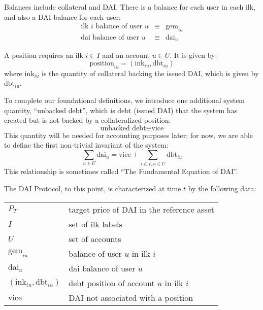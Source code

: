 \documentclass{article}
\begin{document}
Balances include collateral and DAI. There is a balance for each user in each ilk, and also a DAI balance for each user:
\begin{eqnarray}
    \text{ilk }i\text{ balance of user }u & \equiv & \text{gem}_{iu} \\
             \text{dai balance of user }u & \equiv & \text{dai}_{u}
\end{eqnarray}

A position requires an ilk \(i \in I\) and an account \(u \in U\). It is given by:
\begin{equation}
    \text{position}_{iu} = (\text{ink}_{iu}, \text{dbt}_{iu})
\end{equation}
where \(\text{ink}_{iu}\) is the quantity of collateral backing the issued DAI, which is given by \(\text{dbt}_{iu}\).

To complete our foundational definitions, we introduce one additional system quantity, ``unbacked debt'', which is debt (issued DAI) that the system has created but is not backed by a collateralized position:
\begin{equation}
    \text{unbacked debt} \equiv \text{vice}
\end{equation}
This quantity will be needed for accounting purposes later; for now, we are able to define the first non-trivial invariant of the system:
\begin{equation}
    \label{eqn:FundEqOfDai}
    \sum_{u \in U} \text{dai}_u = \text{vice} + \sum_{i \in I, u \in U} \text{dbt}_{iu}
\end{equation}
This relationship is sometimes called ``The Fundamental Equation of DAI''.

The DAI Protocol, to this point, is characterized at time \(t\) by the following data:

\begin{tabular}{l l}
    \(P_T\) & target price of DAI in the reference asset \\
    \(I\)      & set of ilk labels \\
    \(U\)      & set of accounts \\
    \(\text{gem}_{iu}\) & balance of user \(u\) in ilk \(i\) \\
    \(\text{dai}_{u}\)  & dai balance of user \(u\) \\
    \((\text{ink}_{iu}, \text{dbt}_{iu})\) & debt position of account \(u\) in ilk \(i\) \\
    \(\text{vice}\) & DAI not associated with a position \\
\end{tabular}
\end{document}
